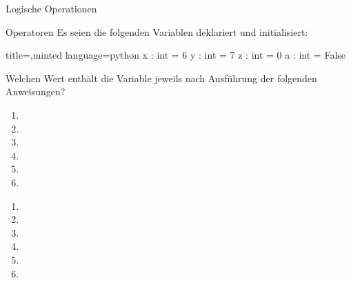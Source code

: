 \begin{task}[points=auto]{Logische Operationen }
    \begin{subtask*}[points=0]{Operatoren}
        Es seien die folgenden Variablen deklariert und initialisiert:
        \begin{codeBlock}[]{title=,minted language=python}
            x : int = 6
            y : int = 7
            z : int = 0
            a : int = False
        \end{codeBlock}
        Welchen Wert enthält die Variable  jeweils nach Ausführung der folgenden Anweisungen?
        \begin{enumerate}
            \item {}
            \item {}
            \item {}
            \item {}
            \item {}
            \item {}
        \end{enumerate}

        \begin{solution}
            \begin{multicols}{3}
                \begin{enumerate}
                    \item {}
                    \item {}
                    \item {}
                    \item {}
                    \item {}
                    \item {}
                \end{enumerate}
            \end{multicols}
        \end{solution}
    \end{subtask*}
\end{task}
